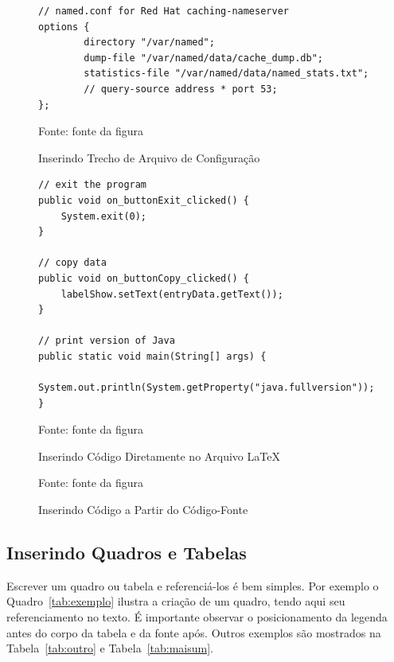 \begin{figure}[!htb]
\centering
\caption{Inserindo Trecho de Arquivo de Configuração} %
\begin{Verbatim}[fontsize=\small]
// named.conf for Red Hat caching-nameserver
options {
        directory "/var/named";
        dump-file "/var/named/data/cache_dump.db";
        statistics-file "/var/named/data/named_stats.txt";
        // query-source address * port 53;
};
\end{Verbatim} 
{\small Fonte: fonte da figura} %
\label{fig:exemploconfig} %
\end{figure}


\begin{figure}[!htb]
\centering
\caption{Inserindo Código Diretamente no Arquivo \LaTeX} %
\begin{lstlisting}
// exit the program
public void on_buttonExit_clicked() {
	System.exit(0);
}

// copy data
public void on_buttonCopy_clicked() {
	labelShow.setText(entryData.getText());
}

// print version of Java
public static void main(String[] args) {
	System.out.println(System.getProperty("java.fullversion"));
}
\end{lstlisting} 
{\small Fonte: fonte da figura} %
\label{fig:exemplocodigo1} %
\end{figure}


\begin{figure}[H]
\centering
\caption{Inserindo Código a Partir do Código-Fonte} %
\label{fig:exemplocodigo2} %

{\small Fonte: fonte da figura} %
\end{figure}

\subsection{Inserindo Quadros e Tabelas}

Escrever um quadro ou tabela e referenciá-los é bem simples. Por exemplo o Quadro~\ref{tab:exemplo} ilustra a criação de um quadro, tendo aqui seu referenciamento no texto. É importante observar o posicionamento da legenda antes do corpo da tabela e da fonte após. Outros exemplos são mostrados na Tabela~\ref{tab:outro} e Tabela~\ref{tab:maisum}.

